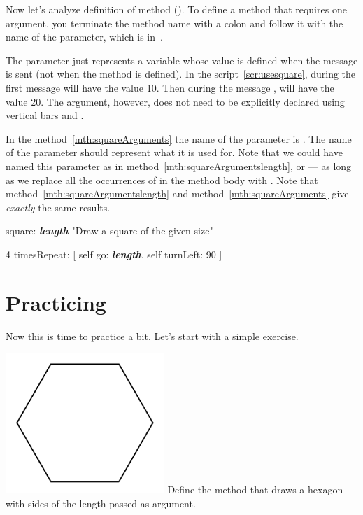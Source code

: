 Now let's analyze definition of  method  ().  To define a method that requires one  argument, you terminate the method name with a colon \ct{:} and follow it with the name of the parameter, which is  in~. 

The parameter just represents a variable whose value is defined when the message is sent (not when the method is defined). In the script~\ref{scr:usesquare}, during the first message   will have the value 10. Then during the message ,  will have the value 20.  The argument, however, does not need to be explicitly declared using vertical bars \ct{|} and \ct{|}.
 
In the method~\ref{mth:squareArguments} the name of the parameter is . The name of the parameter should represent what it is used for. Note that we could have named this parameter  as in method~\ref{mth:squareArgumentslength}, or  --- as long as we replace all the occurrences of  in the method body with . Note that method~\ref{mth:squareArgumentslength} and  method~\ref{mth:squareArguments} give \emph{exactly} the same results.

\begin{method}\label{mth:squareArgumentslength}
square: \textbf{\emph{length}}
   "Draw a square of the given size"

   4 timesRepeat: 
                    [ self go: \textbf{\emph{length}}.
                    self turnLeft: 90 ]
\end{method}


\section{Practicing}
Now this is time to practice a bit. Let's start with a simple exercise.

\begin{exofigwithsizeandtitle}[0.5]{\includegraphics[width=6cm]{ArgHexagon}}{}
Define the method  that draws a hexagon with sides of the length passed as argument.
\end{exofigwithsizeandtitle}

